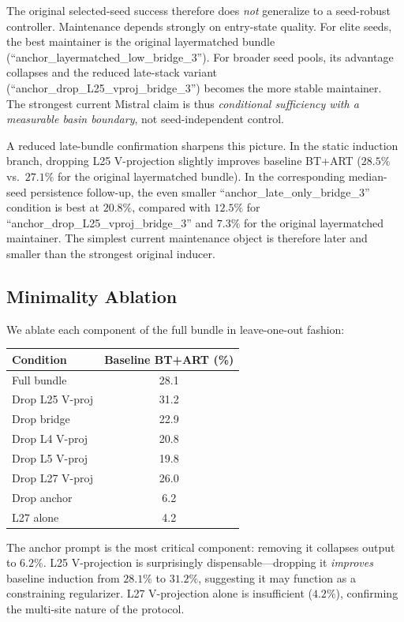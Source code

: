 \documentclass{article}
\begin{document}
The original selected-seed success therefore does \emph{not} generalize to a
seed-robust controller.
Maintenance depends strongly on entry-state quality.
For elite seeds, the best maintainer is the original layermatched bundle
(``anchor\_layermatched\_low\_bridge\_3'').
For broader seed pools, its advantage collapses and the reduced late-stack variant
(``anchor\_drop\_L25\_vproj\_bridge\_3'') becomes the more stable maintainer.
The strongest current Mistral claim is thus \emph{conditional sufficiency with a
measurable basin boundary}, not seed-independent control.

A reduced late-bundle confirmation sharpens this picture.
In the static induction branch, dropping L25 V-projection slightly improves baseline
BT+ART ($28.5\%$ vs.\ $27.1\%$ for the original layermatched bundle).
In the corresponding median-seed persistence follow-up, the even smaller
``anchor\_late\_only\_bridge\_3'' condition is best at $20.8\%$, compared with
$12.5\%$ for ``anchor\_drop\_L25\_vproj\_bridge\_3'' and $7.3\%$ for the original
layermatched maintainer.
The simplest current maintenance object is therefore later and smaller than the
strongest original inducer.

\subsection{Minimality Ablation}

We ablate each component of the full bundle in leave-one-out fashion:

\begin{center}
\small
\begin{tabular}{lc}
\toprule
\textbf{Condition} & \textbf{Baseline BT+ART (\%)} \\
\midrule
Full bundle & 28.1 \\
Drop L25 V-proj & 31.2 \\
Drop bridge & 22.9 \\
Drop L4 V-proj & 20.8 \\
Drop L5 V-proj & 19.8 \\
Drop L27 V-proj & 26.0 \\
Drop anchor & 6.2 \\
L27 alone & 4.2 \\
\bottomrule
\end{tabular}
\end{center}

The anchor prompt is the most critical component: removing it collapses output to $6.2\%$.
L25 V-projection is surprisingly dispensable---dropping it \emph{improves} baseline induction
from $28.1\%$ to $31.2\%$, suggesting it may function as a constraining regularizer.
L27 V-projection alone is insufficient ($4.2\%$), confirming the multi-site nature of the
protocol.
\end{document}
